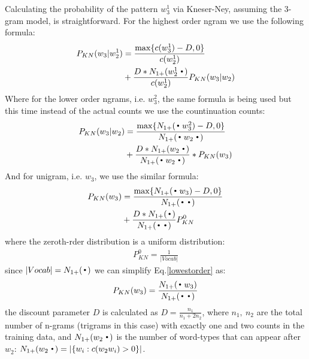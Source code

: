 Calculating the probability of the pattern $w^{1}_{3}$ via Kneser-Ney, assuming the 3-gram model, is straightforward. For the highest order ngram we use the following formula:
\begin{align}\label{highestorder}
 P_{KN}(w_3|w^{1}_{2}) &= \frac{\max\{c(w^{1}_{3}) - D,0\}}{c(w^{1}_{2})}\\\nonumber
 &+ \frac{D*N_{1+}(w^{1}_{2}\Bigcdot)}{c(w^{1}_{2})} P_{KN}(w_3|w_2)
\end{align}
Where for the lower order ngrams, i.e. $w^{2}_{3}$, the same formula is being used but this time instead of the actual counts we use the countinuation counts:
\begin{align}\label{midorder}
P_{KN}(w_3|w_2) &= \frac{\max\{N_{1+}(\Bigcdot w^{2}_{3}) - D,0\}}{N_{1+}(\Bigcdot w_2 \Bigcdot)} \\\nonumber
&+ \frac{D*N_{1+}(w_2\Bigcdot)}{N_{1+}(\Bigcdot w_2 \Bigcdot)}*P_{KN}(w_3)
\end{align}
And for unigram, i.e. $w_3$, we use the similar formula:
\begin{align}\label{lowestorder}
P_{KN}(w_3) &= \frac{\max\{N_{1+}(\Bigcdot w_3) - D,0\}}{N_{1+}(\Bigcdot \Bigcdot)} \\\nonumber 
&+ \frac{D*N_{1+}(\Bigcdot)}{N_{1+}(\Bigcdot\Bigcdot)} P_{KN}^{0}
\end{align}
where the zeroth-rder distribution is a uniform distribution:
\begin{align}\label{uniform}
P_{KN}^{0} = \frac{1}{|Vocab|}
\end{align}
since $|Vocab| = N_{1+}(\Bigcdot)$ we can simplify Eq.\ref{lowestorder} as:
\begin{align}\label{lowestordersimple}
P_{KN}(w_3) = \frac{N_{1+}(\Bigcdot w_3)}{N_{1+}(\Bigcdot\Bigcdot)}
\end{align}
the discount parameter $D$ is calculated as $D=\frac{n_1}{n_1 + 2 n_2}$, where $n_1,\ n_2$ are the total number of n-grams (trigrams in this case) with exactly one and two counts in the training data, and $N_{1+}(w_2\Bigcdot)$ is the number of word-types that can appear after \emph{$w_2$}: $N_{1+}(w_2\Bigcdot) = |\{w_i: c(w_2w_i)>0\}|$.

